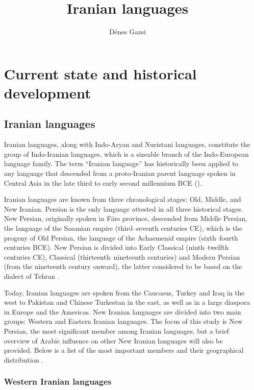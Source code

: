 \documentclass[output=paper]{langsci/langscibook}
\author{Dénes Gazsi\affiliation{University of Iowa}}
\title{Iranian languages}
\begin{document}
\maketitle 

\section{Current state and historical development}

\subsection{Iranian languages}

Iranian languages, along with Indo-Aryan and Nuristani languages, constitute the group of Indo-Iranian languages, which is a sizeable branch of the Indo-European language family. The term ``Iranian language'' has historically been applied to any language that descended from a proto-Iranian parent language spoken in Central Asia in the late third to early second millennium BCE (\citealt{Skjærvø2012}).

Iranian languages are known from three chronological stages: Old, Middle, and New Iranian. Persian is the only language attested in all three historical stages. New Persian, originally spoken in Fārs province, descended from Middle Persian, the language of the Sasanian empire (third–seventh centuries CE), which is the progeny of Old Persian, the language of the Achaemenid empire (sixth–fourth centuries BCE). New Persian is divided into Early Classical (ninth–twelfth centuries CE), Classical (thirteenth–nineteenth centuries) and Modern Persian (from the nineteenth century onward), the latter considered to be based on the dialect of Tehran \citep[427]{Jeremiás2003}. 

Today, Iranian languages are spoken from the Caucasus, Turkey and Iraq in the west to Pakistan and Chinese Turkestan in the east, as well as in a large diaspora in Europe and the Americas. New Iranian languages are divided into two main groups: Western and Eastern Iranian languages. The focus of this study is New Persian, the most significant member among Iranian languages, but a brief overview of Arabic influence on other New Iranian languages will also be provided. Below is a list of the most important members and their geographical distribution \citep[246]{Schmitt1989}.


\subsubsection{Western Iranian languages}
\end{document}
